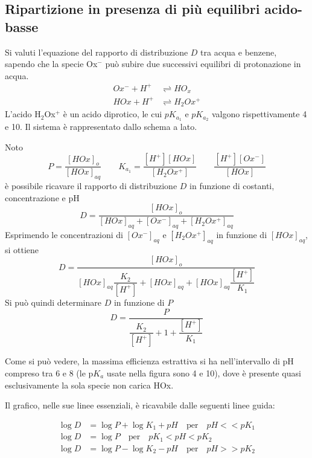 \subsection{Ripartizione in presenza di più equilibri acido-basse}


Si valuti l'equazione del rapporto di distribuzione $D$ tra acqua e benzene, sapendo che la specie Ox$^-$ può subire due successivi equilibri di protonazione in acqua.
\begin{align*}
Ox^- + H^+ & \rightleftharpoons HO_x\\
HOx + H^+ & \rightleftharpoons H_2Ox^+
\end{align*}
L'acido H$_2$Ox$^+$ è un acido diprotico, le cui $pK_{a_1}$ e $pK_{a_2}$ valgono rispettivamente 4 e 10. Il sistema è rappresentato dallo schema a lato.

Noto
\[
P = \frac{[HOx]_o}{[HOx]_{aq}} \qquad K_{a_1} = \frac{[H^+] [HOx]}{[H_2Ox^+]} \qquad \frac{[H^+] [Ox^-]}{[HOx]}
\]
è possibile ricavare il rapporto di distribuzione $D$ in funzione di costanti, concentrazione e pH
\[
D = \frac{[HOx]_o}{[HOx]_{aq} + [Ox^-]_{aq} + [H_2Ox^+]_{aq}}
\]
Esprimendo le concentrazioni di $[Ox^-]_{aq}$ e $[H_2Ox^+]_{aq}$ in funzione di $[HOx]_{aq}$, si ottiene
\[
D = \dfrac{[HOx]_o}{[HOx]_{aq} \dfrac{K_2}{[H^+]} + [HOx]_{aq} + [HOx]_{aq} \dfrac{[H^+]}{K_1}}
\]
Si può quindi determinare $D$ in funzione di $P$
\[
D = \dfrac{P}{\dfrac{K_2}{[H^+]} + 1 + \dfrac{[H^+]}{K_1}}
\]

Come si può vedere, la massima efficienza estrattiva si ha nell'intervallo di pH compreso tra 6 e 8 (le p$K_a$ usate nella figura sono 4 e 10), dove è presente quasi esclusivamente la sola specie non carica HOx.

Il grafico, nelle sue linee essenziali, è ricavabile dalle seguenti linee guida:

\begin{align*}
\log D &= \log P + \log K_1 + pH \quad \text{per} \quad pH << pK_1\\
\log D &= \log P \quad \text{per} \quad pK_1 < pH < pK_2\\
\log D &= \log P - \log K_2 - pH \quad \text{per} \quad pH >> pK_2\\
\end{align*}


